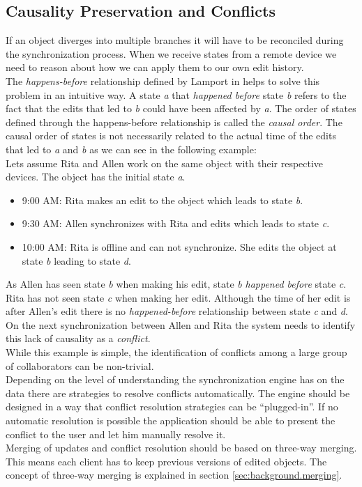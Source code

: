 \subsection{Causality Preservation and Conflicts}
\label{sec:main.requirements.causality}
If an object diverges into multiple branches it will have to be reconciled during the synchronization process.
When we receive states from a remote device we need to reason about how we can apply them to our own edit history.\\
The \emph{happens-before} relationship defined by Lamport in \cite{Lamport:1978tr} helps to solve this problem in an intuitive way.
A state \emph{a} that \emph{happened before} state \emph{b} refers to the fact that the edits that led to \emph{b} could have been affected by \emph{a}. The order of states defined through the happens-before relationship is called the \emph{causal order}.
The causal order of states is not necessarily related to the actual time of the edits that led to \emph{a} and \emph{b} as we can see in the following example:\\

Lets assume Rita and Allen work on the same object with their respective devices.
The object has the initial state \emph{a}.

\begin{itemize}
\item 9:00 AM: Rita makes an edit to the object which leads to state \emph{b}.
\item 9:30 AM: Allen synchronizes with Rita and edits which leads to state \emph{c}.
\item 10:00 AM: Rita is offline and can not synchronize. She edits the object at state \emph{b} leading to state \emph{d}. 
\end{itemize}

As Allen has seen state \emph{b} when making his edit, state \emph{b} \emph{happened before} state \emph{c}.\\
Rita has not seen state \emph{c} when making her edit.
Although the time of her edit is after Allen's edit there is no \emph{happened-before} relationship between state \emph{c} and \emph{d}.\\
On the next synchronization between Allen and Rita the system needs to identify this lack of causality as a \emph{conflict}.\\
While this example is simple, the identification of conflicts among a large group of collaborators can be non-trivial.\\
Depending on the level of understanding the synchronization engine has on the data there are strategies to resolve conflicts automatically.
The engine should be designed in a way that conflict resolution strategies can be ``plugged-in''.
If no automatic resolution is possible the application should be able to present the conflict to the user and let him manually resolve it.\\
Merging of updates and conflict resolution should be based on three-way merging.
This means each client has to keep previous versions of edited objects.
The concept of three-way merging is explained in section \ref{sec:background.merging}.

